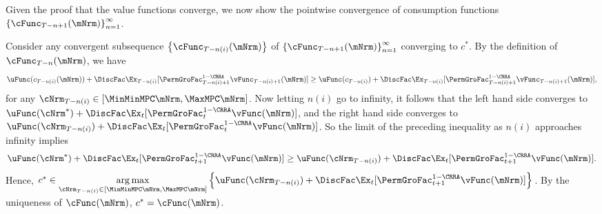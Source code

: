 \documentclass[\econtexRoot/BufferStockTheory]{subfiles}
\begin{document}
Given the proof that the value functions converge, we now show the
pointwise convergence of consumption functions
$\left\{\cFunc_{T-n+1}(\mNrm)\right\} _{n=1}^{\infty }$.

Consider any convergent subsequence $\left\{\cFunc_{T-n(i)}(\mNrm)\right\}$ of $\left\{\cFunc_{T-n+1}(\mNrm)\right\} _{n=1}^{\infty }$ converging to $c^*$. By the definition of $\cFunc_{T-n}(\mNrm)$, we have 
\begin{equation}
    \uFunc(c_{T - n(i)}(\mNrm)) + \DiscFac \Ex_{T - n(i)}[{\PermGroFac}_{T-n(i)+1}^{1 - \CRRA}\vFunc_{T-n(i)+1}(\mNrm)] \geq \uFunc(c_{T - n(i)}) + \DiscFac \Ex_{T - n(i)}[{\PermGroFac}_{T-n(i)+1}^{1 - \CRRA}\vFunc_{T-n(i)+1}(\mNrm)],
\end{equation}
for any $\cNrm_{T - n(i)} \in [\MinMinMPC \mNrm,\MaxMPC \mNrm]$. Now letting $n(i)$ go to infinity, it follows that the left hand side converges to $\uFunc(\cNrm^*) + \DiscFac \Ex_{t}[{\PermGroFac}_{t}^{1 - \CRRA}\vFunc(\mNrm)]$, and the right hand side converges to $\uFunc(\cNrm_{T - n(i)}) + \DiscFac \Ex_{t}[{\PermGroFac}_{t}^{1 - \CRRA}\vFunc(\mNrm)]$. So the limit of the preceding inequality as $n(i)$ approaches infinity implies 
\begin{equation}
   \uFunc(\cNrm^*) + \DiscFac \Ex_{t}[{\PermGroFac}_{t + 1}^{1 - \CRRA}\vFunc(\mNrm)] \geq \uFunc(\cNrm_{T - n(i)}) + \DiscFac \Ex_{t}[{\PermGroFac}_{t + 1}^{1 - \CRRA}\vFunc(\mNrm)].
\end{equation}
Hence, $c^* \in \underset{\cNrm_{T - n(i)} \in [\MinMinMPC \mNrm,\MaxMPC \mNrm]}{\arg \max }\left\{ \uFunc(\cNrm_{T - n(i)}) + \DiscFac \Ex_{t}[{\PermGroFac}_{t + 1}^{1 - \CRRA}\vFunc(\mNrm)]\right\}$. By the uniqueness of $\cFunc(\mNrm)$, $c^* = \cFunc(\mNrm)$.
\end{document}
